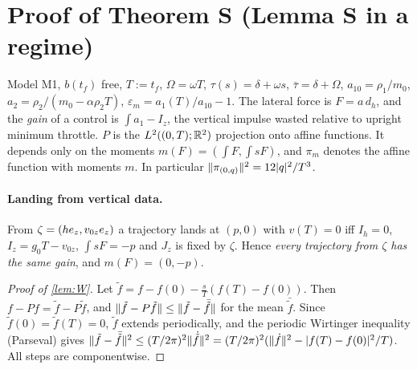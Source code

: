 \section{Proof of Theorem S (Lemma S in a regime)}\label{app:S}
Model M1, $b(t_f)$ free, $T:=t_f$,
$\Omega=\omega T$, $\tau(s)=\delta+\omega s$, $\bar\tau=\delta+\Omega$, $a_{10}=\rho_1/m_0$, $a_2=\rho_2/(m_0-\alpha\rho_2T)$,
$\varepsilon_m=a_1(T)/a_{10}-1$. The lateral force is $F=a\,d_h$, and the \emph{gain} of a control is $\int a_1-I_z$, the vertical
impulse wasted relative to upright minimum throttle. $P$ is the $L^2((0,T);\mathbb{R}^2)$ projection onto affine functions. It depends
only on the moments $m(F)=(\int F,\int sF)$, and $\pi_m$ denotes the affine function with moments $m$. In particular
$\lVert \pi_{(0,q)}\rVert^2=12|q|^2/T^3$.

\paragraph{Landing from vertical data.} From $\zeta=(he_z,v_{0z}e_z)$ a trajectory lands at $(p,0)$ with $v(T)=0$ iff $I_h=0$,
$I_z=g_0T-v_{0z}$, $\int sF=-p$ and $J_z$ is fixed by $\zeta$. Hence \emph{every trajectory from $\zeta$ has the same gain}, and
$m(F)=(0,-p)$.

\begin{proof}[Proof of \cref{lem:W}]
Let $\tilde f=f-f(0)-\tfrac sT(f(T)-f(0))$. Then $f-Pf=\tilde f-P\tilde f$, and $\lVert \tilde f-P\tilde f\rVert\le\lVert \tilde f-\bar{\tilde f}\rVert$ for the mean
$\bar{\tilde f}$. Since $\tilde f(0)=\tilde f(T)=0$, $\tilde f$ extends periodically, and the periodic Wirtinger inequality (Parseval) gives
$\lVert \tilde f-\bar{\tilde f}\rVert^2\le(T/2\pi)^2\lVert \dot{\tilde f}\rVert^2=(T/2\pi)^2(\lVert \dot f\rVert^2-|f(T)-f(0)|^2/T)$. All steps are componentwise.
\end{proof}

